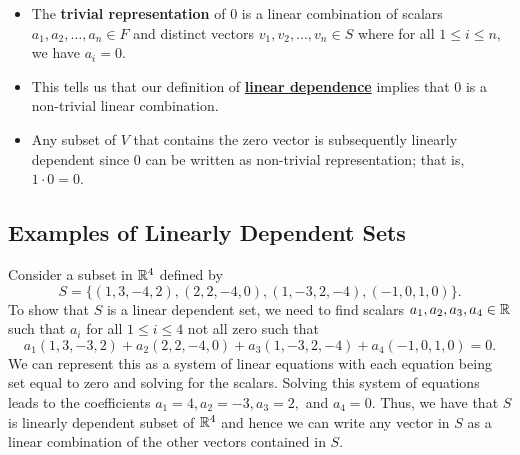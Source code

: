 \begin{itemize}
    \item The \textbf{trivial representation} of \( 0  \) is a linear combination of scalars \( a_{1}, a_{2}, \dots, a_{n} \in F  \) and distinct vectors \( v_{1}, v_{2}, \dots, v_{n}   \in S   \) where for all \( 1 \leq i \leq n  \), we have \( a_{i} = 0  \). 
    \item This tells us that our definition of {\hyperref[linear dependence]{\textbf{linear dependence}}} implies that \( 0  \) is a non-trivial linear combination.
    \item Any subset of \( V  \) that contains the zero vector is subsequently linearly dependent since \(  0  \) can be written as non-trivial representation; that is, \( 1 \cdot 0 = 0  \).
\end{itemize}

\subsection{Examples of Linearly Dependent Sets}

\begin{eg}
   Consider a subset in \( \mathbb{R}^{4} \) defined by 
   \[  S = \{ (1,3,-4,2), (2,2,-4,0) , (1, -3, 2 ,-4), (-1, 0, 1, 0) \}.\] To show that \( S \) is a linear dependent set, we need to find scalars \( a_{1}, a_{2}, a_{3}, a_{4} \in \mathbb{R}  \) such that \( a_{i} \) for all \( 1 \leq i \leq 4 \) not all zero such that  
   \[  a_{1} (1,3,-3,2) + a_{2} (2,2,-4,0) + a_{3} (1,-3,2,-4) + a_{4} (-1 , 0, 1, 0) = 0.  \]
    We can represent this as a system of linear equations with each equation being set equal to zero and solving for the scalars. Solving this system of equations leads to the coefficients \( a_{1} = 4 , a_{2} = -3 , a_{3} = 2,   \) and \( a_{4} = 0  \). Thus, we have that \( S  \) is linearly dependent subset of \( \mathbb{R}^{4} \) and hence we can write any vector in \( S  \) as a linear combination of the other vectors contained in \( S  \).
\end{eg}

